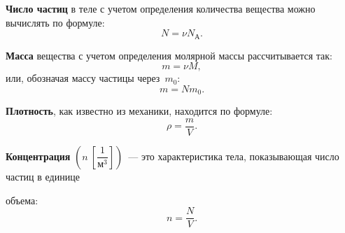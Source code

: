 \documentclass[main.tex]{subfiles}
\begin{document}
\textbf{Число частиц} в теле с учетом определения количества вещества можно вычислять по формуле:
\begin{equation}
    N=\nu N_\text{А}.
\end{equation}

\textbf{Масса} вещества с учетом определения молярной массы рассчитывается так:
\begin{equation}
    m=\nu M,
\end{equation}
или, обозначая массу частицы через~$m_0$:
\begin{equation}
    m=Nm_0.
\end{equation}

\textbf{Плотность}, как известно из механики, находится по формуле:
\begin{equation}
    \rho=\frac{m}{V}.
\end{equation}

\textbf{Концентрация} $\left(n\ \left[\dfrac{1}{\text{м}^3}\right]\right)$~--- это характеристика тела, показывающая число частиц в единице \strut объема:
\begin{equation}
    n=\dfrac{N}{V}.
\end{equation}



































\end{document}
